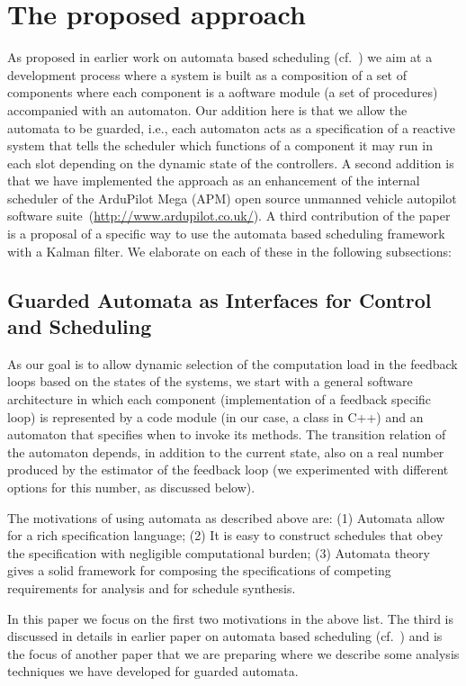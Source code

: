 \documentclass{sig-alternate-ipsn13}
\begin{document}
\section{The proposed approach}
\label{sec:architecture}

As proposed in earlier work on automata based scheduling (cf.~\cite{WA07,RTComposer,AW08}) we aim at a development process where a system is built as a composition of a set of components where each component is a aoftware module (a set of procedures) accompanied with an automaton. Our addition here is that we allow the automata to be guarded, i.e., each automaton acts as a specification of a reactive system that tells the scheduler which functions of a component it may run in each slot depending on the dynamic state of the controllers. A second addition is that we have implemented the approach as an enhancement of the internal scheduler of  the ArduPilot Mega (APM) open source unmanned vehicle autopilot software suite~(\url{http://www.ardupilot.co.uk/}). A third contribution of the paper is a proposal of a specific way to use the automata based scheduling framework with a Kalman filter. We elaborate on each of these in the following subsections:

\subsection{Guarded Automata as Interfaces for Control and Scheduling}
As our goal is to allow dynamic selection of the computation load in the feedback loops based on the states of the systems, we start with a general software architecture in which each component (implementation of a feedback specific loop) is represented by a code module (in our case, a class in C++) and an automaton that specifies when to invoke its methods. The transition relation of the automaton depends, in addition to the current state, also on a real number produced by the estimator of the feedback loop (we experimented with different options for this number, as discussed below).

The motivations of using automata as described above are: (1) Automata allow for a rich specification language; (2) It is easy to construct schedules that obey the specification with negligible computational burden; (3) Automata theory gives a solid framework for composing the specifications of competing requirements for analysis and for schedule synthesis. 

In this paper we focus on the first two motivations in the above list. The third is discussed in details in earlier paper on automata based scheduling (cf.~\cite{WA07,RTComposer,AW08}) and is the focus of another paper that we are preparing where we describe some analysis techniques we have developed for guarded automata.   
\end{document}
